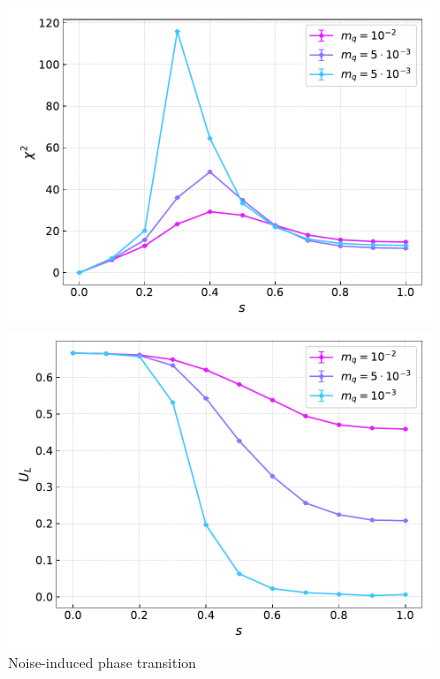 \begin{figure}[h]
\begin{minipage}{0.45\textwidth}
	\includegraphics[scale=0.48]{figures/chiral_PT/chi2.pdf}
\end{minipage}
\hfill
\begin{minipage}{0.45\textwidth}
	\includegraphics[scale=0.48]{figures/chiral_PT/binder.pdf}
\end{minipage}
\hfill
\caption{Noise-induced phase transition}
\label{fig:chiral:symmetry_breaking}
\end{figure}


